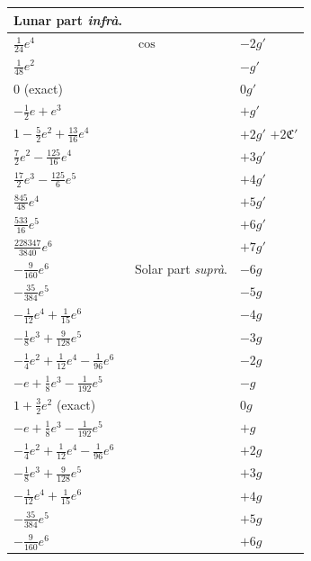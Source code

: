 \documentclass[11pt]{article}
\begin{document}
\begin{center}
\begin{tabular}{|l|l|l|}
\hline
\multicolumn{1}{|c|}{Lunar part \textit{infr\`a}.} & & \\
\hline
$\tfrac{1}{24}e^{4}$                               & $\cos$ & $-2g'$ \\
$\tfrac{1}{48}e^{2}$                               &        & $-g'$ \\
$0$ (exact)                                        &        & $0g'$ \\
$-\tfrac{1}{2}e+e^{3}$                             &        & $+g'$ \\
$1-\tfrac{5}{2}e^{2}+\tfrac{13}{16}e^{4}$          &        & $+2g'$ \quad $+2\mathfrak{C}'$ \\
$\tfrac{7}{2}e^{2}-\tfrac{125}{16}e^{4}$           &        & $+3g'$ \\
$\tfrac{17}{2}e^{3}-\tfrac{125}{6}e^{5}$           &        & $+4g'$ \\
$\tfrac{845}{48}e^{4}$                             &        & $+5g'$ \\
$\tfrac{533}{16}e^{5}$                             &        & $+6g'$ \\
$\tfrac{228347}{3840}e^{6}$                        &        & $+7g'$ \\
\hline
$-\tfrac{9}{160}e^{6}$                                 & Solar part \textit{supr\`a}. & $-6g$ \\
$-\tfrac{35}{384}e^{5}$                                &                              & $-5g$ \\
$-\tfrac{1}{12}e^{4}+\tfrac{1}{15}e^{6}$               &                              & $-4g$ \\
$-\tfrac{1}{8}e^{3}+\tfrac{9}{128}e^{5}$               &                              & $-3g$ \\
$-\tfrac{1}{4}e^{2}+\tfrac{1}{12}e^{4}-\tfrac{1}{96}e^{6}$ &                          & $-2g$ \\
$-e+\tfrac{1}{8}e^{3}-\tfrac{1}{192}e^{5}$             &                              & $-g$ \\
$1+\tfrac{3}{2}e^{2}$ (exact)                          &                              & $0g$ \\
$-e+\tfrac{1}{8}e^{3}-\tfrac{1}{192}e^{5}$             &                              & $+g$ \\
$-\tfrac{1}{4}e^{2}+\tfrac{1}{12}e^{4}-\tfrac{1}{96}e^{6}$ &                          & $+2g$ \\
$-\tfrac{1}{8}e^{3}+\tfrac{9}{128}e^{5}$               &                              & $+3g$ \\
$-\tfrac{1}{12}e^{4}+\tfrac{1}{15}e^{6}$               &                              & $+4g$ \\
$-\tfrac{35}{384}e^{5}$                                &                              & $+5g$ \\
$-\tfrac{9}{160}e^{6}$                                 &                              & $+6g$ \\
\hline
\end{tabular}
\end{center}
\end{document}
